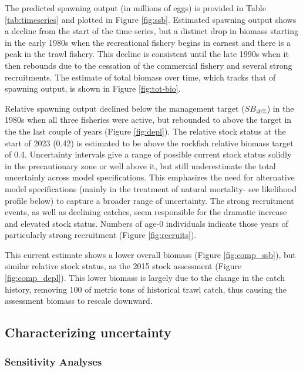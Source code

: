 \documentclass[11pt,
  english,
  letterpaper,
]{article}
\begin{document}
The predicted spawning output (in millions of eggs) is provided in Table \ref{tab:timeseries} and plotted in Figure \ref{fig:ssb}. Estimated spawning output shows a decline from the start of the time series, but a distinct drop in biomass starting in the early 1980s when the recreational fishery begins in earnest and there is a peak in the trawl fishery. This decline is consistent until the late 1990s when it then rebounds due to the cessation of the commercial fishery and several strong recruitments. The estimate of total biomass over time, which tracks that of spawning output, is shown in Figure \ref{fig:tot-bio}.

Relative spawning output declined below the management target (\(SB_{40\%}\)) in the 1980s when all three fisheries were active, but rebounded to above the target in the the last couple of years (Figure \ref{fig:depl}). The relative stock status at the start of 2023 (0.42) is estimated to be above the rockfish relative biomass target of 0.4. Uncertainty intervals give a range of possible current stock status solidly in the precautionary zone or well above it, but still underestimate the total uncertainly across model specifications. This emphasizes the need for alternative model specifications (mainly in the treatment of natural mortality- see likelihood profile below) to capture a broader range of uncertainty. The strong recruitment events, as well as declining catches, seem responsible for the dramatic increase and elevated stock status. Numbers of age-0 individuals indicate those years of particularly strong recruitment (Figure \ref{fig:recruits}).

This current estimate shows a lower overall biomass (Figure \ref{fig:comp_ssb}), but similar relative stock status, as the 2015 stock assessment (Figure \ref{fig:comp_depl}). This lower biomass is largely due to the change in the catch history, removing 100 of metric tons of historical trawl catch, thus causing the assessment biomass to rescale downward.

\hypertarget{characterizing-uncertainty}{%
\subsection{Characterizing uncertainty}\label{characterizing-uncertainty}}

\hypertarget{sensitivity-analyses}{%
\subsubsection{Sensitivity Analyses}\label{sensitivity-analyses}}
\end{document}
